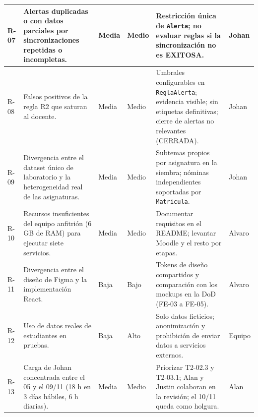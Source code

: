 \documentclass[11pt,a4paper]{article}
\begin{document}
\begin{longtable}{|R{1.1cm}|R{4.4cm}|R{1.3cm}|R{1.5cm}|R{4.1cm}|R{1.6cm}|}
\footnotesize R-07 & \footnotesize Alertas duplicadas o con datos parciales por sincronizaciones repetidas o incompletas. & \footnotesize Media & \footnotesize Medio & \footnotesize Restricción única de \texttt{Alerta}; no evaluar reglas si la sincronización no es EXITOSA. & \footnotesize Johan\\ \hline
\footnotesize R-08 & \footnotesize Falsos positivos de la regla R2 que saturan al docente. & \footnotesize Media & \footnotesize Medio & \footnotesize Umbrales configurables en \texttt{ReglaAlerta}; evidencia visible; sin etiquetas definitivas; cierre de alertas no relevantes (CERRADA). & \footnotesize Johan\\ \hline
\footnotesize R-09 & \footnotesize Divergencia entre el dataset único de laboratorio y la heterogeneidad real de las asignaturas. & \footnotesize Media & \footnotesize Medio & \footnotesize Subtemas propios por asignatura en la siembra; nóminas independientes soportadas por \texttt{Matricula}. & \footnotesize Johan\\ \hline
\footnotesize R-10 & \footnotesize Recursos insuficientes del equipo anfitrión (6 GB de RAM) para ejecutar siete servicios. & \footnotesize Media & \footnotesize Medio & \footnotesize Documentar requisitos en el README; levantar Moodle y el resto por etapas. & \footnotesize Alvaro\\ \hline
\footnotesize R-11 & \footnotesize Divergencia entre el diseño de Figma y la implementación React. & \footnotesize Baja & \footnotesize Bajo & \footnotesize Tokens de diseño compartidos y comparación con los mockups en la DoD (FE-03 a FE-05). & \footnotesize Alvaro\\ \hline
\footnotesize R-12 & \footnotesize Uso de datos reales de estudiantes en pruebas. & \footnotesize Baja & \footnotesize Alto & \footnotesize Solo datos ficticios; anonimización y prohibición de enviar datos a servicios externos. & \footnotesize Equipo\\ \hline
\footnotesize R-13 & \footnotesize Carga de Johan concentrada entre el 05 y el 09/11 (18 h en 3 días hábiles, 6 h diarias). & \footnotesize Media & \footnotesize Medio & \footnotesize Priorizar T2-02.3 y T2-03.1; Alan y Justin colaboran en la revisión; el 10/11 queda como holgura. & \footnotesize Alan\\ \hline
\end{longtable}
\end{document}
